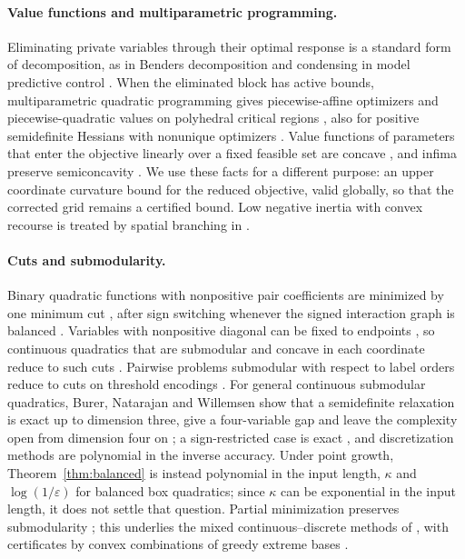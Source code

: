 \paragraph{Value functions and multiparametric programming.}
Eliminating private variables through their optimal response is a standard
form of decomposition, as in Benders decomposition
\cite{Benders1962,Geoffrion1972} and condensing in model predictive control
\cite{BockPlitt1984,JerezKerriganConstantinides2012,Axehill2015}. When the
eliminated block has active bounds, multiparametric quadratic programming
gives piecewise-affine optimizers and piecewise-quadratic values on polyhedral
critical regions \cite{BemporadEtAl2002,TondelJohansenBemporad2003}, also for
positive semidefinite Hessians with nonunique optimizers
\cite{SpjotvoldTondelJohansen2007,PatrinosSarimveis2011}. Value functions of
parameters that enter the objective linearly over a fixed feasible set are
concave \cite{MangasarianRosen1964,FiaccoKyparisis1986}, and infima preserve
semiconcavity \cite{CannarsaSinestrari2004}. We use these facts for a different
purpose: an upper coordinate curvature bound for the reduced objective, valid
globally, so that the corrected grid remains a certified bound. Low negative
inertia with convex recourse is treated by spatial branching in
\cite{Vavasis1992,LuoBaiLimPeng2019}.

\paragraph{Cuts and submodularity.}
Binary quadratic functions with nonpositive pair coefficients are minimized by
one minimum cut \cite{Ivanescu1965,PicardRatliff1975,BorosHammer2002,
KolmogorovZabih2004}, after sign switching whenever the signed interaction
graph is balanced \cite{Harary1953,HammerHansenSimeone1984,Padberg1989}.
Variables with nonpositive diagonal can be fixed to endpoints
\cite{Rosenberg1972,DelPiaKhajavirad2026,Khajavirad2026PolyBox}, so continuous
quadratics that are submodular and concave in each coordinate reduce to such
cuts \cite{BurerNatarajanWillemsen2026v3}. Pairwise problems submodular with
respect to label orders reduce to cuts on threshold encodings
\cite{SchlesingerFlach2006,Ishikawa2003,Hochbaum2001}. For general continuous
submodular quadratics, Burer, Natarajan and Willemsen show that a
semidefinite relaxation is exact up to dimension three, give a
four-variable gap and leave the complexity open from dimension four on
\cite{BurerNatarajanWillemsen2026v3}; a sign-restricted case is exact
\cite{KimKojima2003}, and discretization methods
\cite{Bach2019,Bach2018Isotonic,AxelrodLiuSidford2020} are polynomial in the
inverse accuracy. Under point growth, Theorem~\ref{thm:balanced} is instead
polynomial in the input length, $\kappa$ and $\log(1/\varepsilon)$ for
balanced box quadratics; since $\kappa$ can be exponential in the input
length, it does not settle that question. Partial minimization preserves submodularity
\cite{Topkis1978,Topkis1998}; this underlies the mixed continuous--discrete
methods of \cite{GomezHan2025,BuntonTabuada2022}, with certificates by convex
combinations of greedy extreme bases
\cite{Edmonds1970,Cunningham1985,IwataFleischerFujishige2001}.

